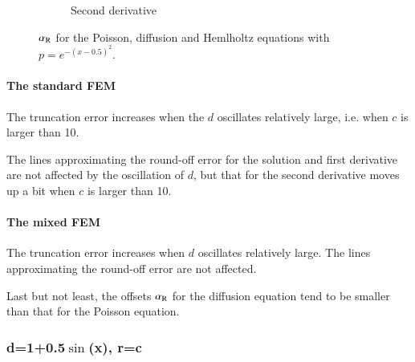 \documentclass[review,3p]{elsarticle}
\begin{document}
\begin{figure}[!ht]
\begin{subfigure}[b]{0.35\textwidth}
{
}
\vspace{-0.7cm}
\caption{Second derivative}
\label{alpha_R_Poisson_benchmark_2_diff_2_Helm_2ndd}
\end{subfigure}
\caption{$\alpha_{\rm R}$ for the Poisson, diffusion and Hemlholtz equations with $p=e^{-(x-0.5)^2}$.}
\label{alpha_R_benchmark_Pois2diff2Helm}
\end{figure}


\newpage
\paragraph{The standard FEM}

The truncation error increases when the $d$ oscillates relatively large, i.e. when $c$ is larger than 10.

The lines approximating the round-off error for the solution and first derivative are not affected by the oscillation of $d$, but that for the second derivative moves up a bit when  $c$ is larger than 10.


\paragraph{The mixed FEM}

The truncation error increases when $d$ oscillates relatively large.
The lines approximating the round-off error are not affected.

Last but not least, the offsets $\alpha_{\rm R}$ for the diffusion equation tend to be smaller than that for the Poisson equation.


\subsubsection{d=1+0.5\texorpdfstring{$\sin$(x)}{sin(x)}, r=c}
\end{document}
